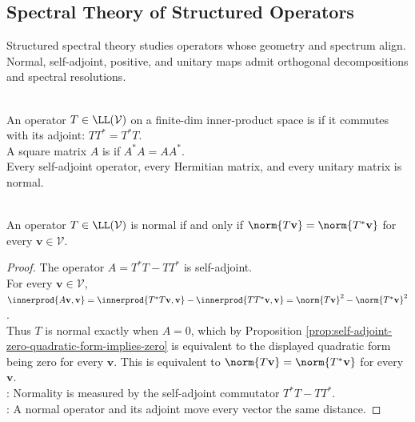 \subsection{Spectral Theory of Structured Operators}

%

Structured spectral theory studies operators whose geometry and spectrum align. Normal, self-adjoint, positive, and unitary maps admit orthogonal decompositions and spectral resolutions.

\begin{definition} \label{def:normal-operator} \\
An operator $T\in\LL(\mathcal{V})$ on a finite-dim inner-product space is  if it commutes with its adjoint: $TT^*=T^*T$.\\
A square matrix $A$ is  if $A^*A=AA^*$.\\
Every self-adjoint operator, every Hermitian matrix, and every unitary matrix is normal.
\end{definition}

\begin{theorem} \label{thm:normal-iff-equal-adjoint-norms} \\
An operator $T\in\LL(\mathcal{V})$ is normal if and only if $\norm{T\mathbf{v}}=\norm{T^*\mathbf{v}}$ for every $\mathbf{v}\in\mathcal{V}$.
\begin{proof}
The operator $A=T^*T-TT^*$ is self-adjoint.\\
For every $\mathbf{v}\in\mathcal{V}$, $\innerprod{A\mathbf{v},\mathbf{v}} =\innerprod{T^*T\mathbf{v},\mathbf{v}}-\innerprod{TT^*\mathbf{v},\mathbf{v}} =\norm{T\mathbf{v}}^2-\norm{T^*\mathbf{v}}^2$.\\
Thus $T$ is normal exactly when $A=0$, which by Proposition \ref{prop:self-adjoint-zero-quadratic-form-implies-zero} is equivalent to the displayed quadratic form being zero for every $\mathbf{v}$. This is equivalent to $\norm{T\mathbf{v}}=\norm{T^*\mathbf{v}}$ for every $\mathbf{v}$.\\
: Normality is measured by the self-adjoint commutator $T^*T-TT^*$.\\
: A normal operator and its adjoint move every vector the same distance.
\end{proof}
\end{theorem}

